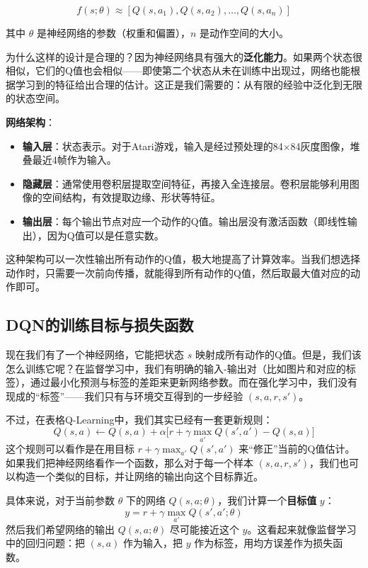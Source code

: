 \documentclass[lang=cn,zihao=-4,a4paper,fontset=windows]{beautybook}
\begin{document}
\[
f(s; \theta) \approx [Q(s, a_1), Q(s, a_2), \ldots, Q(s, a_n)]
\]

其中 \(\theta\) 是神经网络的参数（权重和偏置），\(n\) 是动作空间的大小。

为什么这样的设计是合理的？因为神经网络具有强大的\textbf{泛化能力}。如果两个状态很相似，它们的Q值也会相似——即使第二个状态从未在训练中出现过，网络也能根据学习到的特征给出合理的估计。这正是我们需要的：从有限的经验中泛化到无限的状态空间。

\textbf{网络架构}：
\begin{itemize}
    \item \textbf{输入层}：状态表示。对于Atari游戏，输入是经过预处理的84×84灰度图像，堆叠最近4帧作为输入。
    \item \textbf{隐藏层}：通常使用卷积层提取空间特征，再接入全连接层。卷积层能够利用图像的空间结构，有效提取边缘、形状等特征。
    \item \textbf{输出层}：每个输出节点对应一个动作的Q值。输出层没有激活函数（即线性输出），因为Q值可以是任意实数。
\end{itemize}

这种架构可以一次性输出所有动作的Q值，极大地提高了计算效率。当我们想选择动作时，只需要一次前向传播，就能得到所有动作的Q值，然后取最大值对应的动作即可。

\subsection{DQN的训练目标与损失函数}

现在我们有了一个神经网络，它能把状态 $s$ 映射成所有动作的Q值。但是，我们该怎么训练它呢？在监督学习中，我们有明确的输入-输出对（比如图片和对应的标签），通过最小化预测与标签的差距来更新网络参数。而在强化学习中，我们没有现成的“标签”——我们只有与环境交互得到的一步经验 $(s,a,r,s')$。

不过，在表格Q-Learning中，我们其实已经有一套更新规则：  
\[
Q(s,a) \leftarrow Q(s,a) + \alpha \bigl[ r + \gamma \max_{a'} Q(s',a') - Q(s,a) \bigr]
\]
这个规则可以看作是在用目标 $r + \gamma \max_{a'} Q(s',a')$ 来“修正”当前的Q值估计。如果我们把神经网络看作一个函数，那么对于每一个样本 $(s,a,r,s')$，我们也可以构造一个类似的目标，并让网络的输出向这个目标靠近。

具体来说，对于当前参数 $\theta$ 下的网络 $Q(s,a;\theta)$，我们计算一个\textbf{目标值} $y$：
\[
y = r + \gamma \max_{a'} Q(s',a'; \theta)
\]
然后我们希望网络的输出 $Q(s,a;\theta)$ 尽可能接近这个 $y$。这看起来就像监督学习中的回归问题：把 $(s,a)$ 作为输入，把 $y$ 作为标签，用均方误差作为损失函数。
\end{document}
